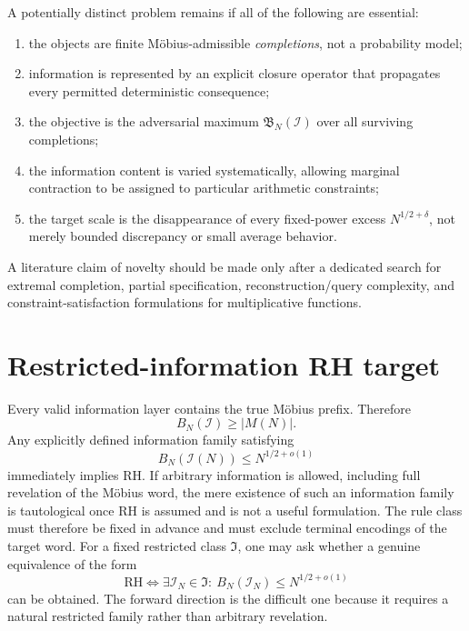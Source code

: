 \documentclass[11pt]{article}
\begin{document}
A potentially distinct problem remains if all of the following are essential:
\begin{enumerate}
\item the objects are finite Möbius-admissible \emph{completions}, not a probability model;
\item information is represented by an explicit closure operator that propagates every permitted deterministic consequence;
\item the objective is the adversarial maximum $\mathfrak B_N(\mathcal I)$ over all surviving completions;
\item the information content is varied systematically, allowing marginal contraction to be assigned to particular arithmetic constraints;
\item the target scale is the disappearance of every fixed-power excess $N^{1/2+\delta}$, not merely bounded discrepancy or small average behavior.
\end{enumerate}
A literature claim of novelty should be made only after a dedicated search for extremal completion, partial specification, reconstruction/query complexity, and constraint-satisfaction formulations for multiplicative functions.


\section{Restricted-information RH target}
Every valid information layer contains the true Möbius prefix. Therefore
\[
 B_N(\mathcal I)\ge |M(N)|.
\]
Any explicitly defined information family satisfying
\[
 B_N(\mathcal I(N))\le N^{1/2+o(1)}
\]
immediately implies RH. If arbitrary information is allowed, including full revelation of the Möbius word, the mere existence of such an information family is tautological once RH is assumed and is not a useful formulation. The rule class must therefore be fixed in advance and must exclude terminal encodings of the target word. For a fixed restricted class $\mathfrak I$, one may ask whether a genuine equivalence of the form
\[
 \mathrm{RH}
 \Longleftrightarrow
 \exists\mathcal I_N\in\mathfrak I:\
 B_N(\mathcal I_N)\le N^{1/2+o(1)}
\]
can be obtained. The forward direction is the difficult one because it requires a natural restricted family rather than arbitrary revelation.
\end{document}
